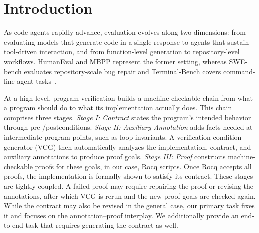 \section{Introduction}

As code agents rapidly advance, evaluation evolves along two dimensions: from evaluating models that generate code in a single response to agents that sustain tool-driven interaction, and from function-level generation to repository-level workflows. HumanEval and MBPP represent the former setting, whereas SWE-bench evaluates repository-scale bug repair and Terminal-Bench covers command-line agent tasks~\cite{chen2021evaluating,austin2021program,jimenez2024swebench,merrill2026terminalbench}.


At a high level, program verification builds a machine-checkable chain from what a program should do to what its implementation actually does. This chain comprises three stages. \emph{Stage I: Contract} states the program's intended behavior through pre-/postconditions. \emph{Stage II: Auxiliary Annotation} adds facts needed at intermediate program points, such as loop invariants. A verification-condition generator (VCG) then automatically analyzes the implementation, contract, and auxiliary annotations to produce proof goals. \emph{Stage III: Proof} constructs machine-checkable proofs  for these goals, in our case, Rocq scripts. Once Rocq accepts all proofs, the implementation is formally shown to satisfy its contract. These stages are tightly coupled. A failed proof may require repairing the proof or revising the annotations, after which VCG is rerun and the new proof goals are checked again. While the contract may also be revised in the general case, our primary task fixes it and focuses on the annotation–proof interplay. We additionally provide an end-to-end task that requires generating the contract as well.

